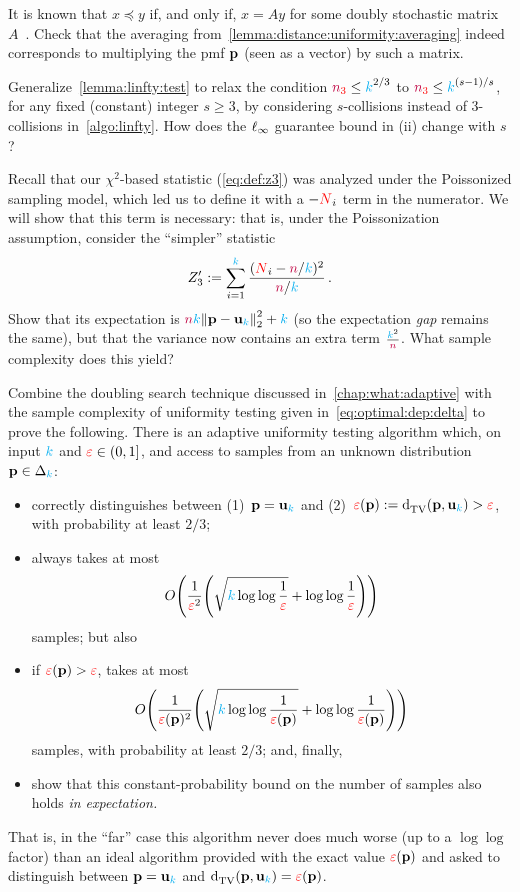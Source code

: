 \begin{question}\label{ex:identity:averaging:stochastic} 
    It is known that $x\preceq y$ if, and only if, $x=Ay$ for some doubly stochastic matrix $A$~\citep[Theorem~2.1]{Arnold87}. Check that the averaging from~\cref{lemma:distance:uniformity:averaging} indeed corresponds to multiplying the pmf $\p$ (seen as a vector) by such a matrix.
\end{question}
\begin{question}[$\star$]\label{ex:linftycheck}
  Generalize~\cref{lemma:linfty:test} to relax the condition $\nsu \leq \ab^{2/3}$ to $\nsu \leq \ab^{(s-1)/s}$, for any fixed (constant) integer $s\geq 3$, by considering $s$-collisions instead of $3$-collisions in~\cref{algo:linfty}. How does the $\lp[\infty]$ guarantee bound in (ii) change with $s$?
\end{question}
\begin{question}[$\star$]
  Recall that our $\chi^2$-based statistic (\cref{eq:def:z3}) was analyzed under the Poissonized sampling model, which led us to define it with a $-\occur_i$ term in the numerator. We will show that this term is necessary: that is, under the Poissonization assumption, consider the ``simpler'' statistic
  \[
      Z'_3 \eqdef \sum_{i=1}^\ab \frac{(\occur_i-\ns/\ab)^2}{\ns/\ab}\,.
  \]
  Show that its expectation is $\ns\ab\normtwo{\p-\uniform_\ab}^2 +\ab$ (so the expectation \emph{gap} remains the same), but that the variance now contains an extra term $\frac{\ab^2}{\ns}$. What sample complexity does this yield?
\end{question}
\begin{question}[$\star$]\label{ex:unif:adaptive}
Combine the doubling search technique discussed in~\cref{chap:what:adaptive} with the sample complexity of uniformity testing given in~\cref{eq:optimal:dep:delta} to prove the following. There is an adaptive uniformity testing algorithm which, on input $\ab$ and $\dst\in(0,1]$, and access to samples from an unknown distribution $\p\in\distribs{\ab}$:
\begin{itemize}
  \item correctly distinguishes between (1)~$\p=\uniform_\ab$ and (2)~$\dst(\p)\eqdef \totalvardist{\p}{\uniform_\ab} > \dst$, with probability at least $2/3$;
  \item always takes at most 
    \[
      \bigO{\frac{1}{\dst^2}\Paren{\sqrt{\ab \log \log \frac{1}{\dst} } + \log \log \frac{1}{\dst} }}
    \] samples; but also
  \item if $\dst(\p) > \dst$, takes at most
    \[
      \bigO{\frac{1}{\dst(\p)^2}\Paren{\sqrt{\ab \log \log \frac{1}{\dst(\p)} } + \log \log \frac{1}{\dst(\p)} }}
    \] samples, with probability at least $2/3$; and, finally,
  \item show that this constant-probability bound on the number of samples also holds \emph{in expectation.}
\end{itemize}
That is, in the ``far'' case this algorithm never does much worse (up to a $\log\log$ factor) than an ideal algorithm provided with the exact value $\dst(\p)$ and asked to distinguish between $\p=\uniform_\ab$ and $\totalvardist{\p}{\uniform_\ab} = \dst(\p)$.
\end{question}
